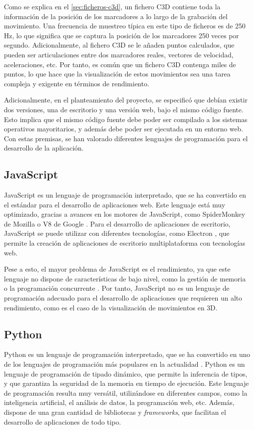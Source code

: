 Como se explica en el \autoref{sec:ficheros-c3d}, un fichero \ac{C3D} contiene toda la información de la posición de los marcadores a lo largo de la grabación del movimiento. Una frecuencia de muestreo típica en este tipo de ficheros es de 250 \ac{Hz}, lo que significa que se captura la posición de los marcadores 250 veces por segundo. Adicionalmente, al fichero \ac{C3D} se le añaden puntos calculados, que pueden ser articulaciones entre dos marcadores reales, vectores de velocidad, aceleraciones, etc. Por tanto, es común que un fichero \ac{C3D} contenga miles de puntos, lo que hace que la visualización de estos movimientos sea una tarea compleja y exigente en términos de rendimiento.

Adicionalmente, en el planteamiento del proyecto, se especificó que debían existir dos versiones, una de escritorio y una versión web, bajo el mismo código fuente. Esto implica que el mismo código fuente debe poder ser compilado a los sistemas operativos mayoritarios, y además debe poder ser ejecutada en un entorno web. Con estas premisas, se han valorado diferentes lenguajes de programación para el desarrollo de la aplicación.  

\subsection{JavaScript}
JavaScript es un lenguaje de programación interpretado, que se ha convertido en el estándar para el desarrollo de aplicaciones web. Este lenguaje está muy optimizado, gracias a avances en los motores de JavaScript, como SpiderMonkey de Mozilla o V8 de Google \autocite{srinetChromeV8Firefox2022}. Para el desarrollo de aplicaciones de escritorio, JavaScript se puede utilizar con diferentes tecnologías, como Electron \autocite{BuildCrossplatformDesktop}, que permite la creación de aplicaciones de escritorio multiplataforma con tecnologías web. 

Pese a esto, el mayor problema de JavaScript es el rendimiento, ya que este lenguaje no dispone de características de bajo nivel, como la gestión de memoria o la programación concurrente \autocite{MemoryManagementJavaScript2025,pengMultithreadingJavascript2017}. Por tanto, JavaScript no es un lenguaje de programación adecuado para el desarrollo de aplicaciones que requieren un alto rendimiento, como es el caso de la visualización de movimientos en 3D.

\subsection{Python}
Python es un lenguaje de programación interpretado, que se ha convertido en uno de los lenguajes de programación más populares en la actualidad \autocite{TIOBEIndex}. Python es un lenguaje de programación de tipado dinámico, que permite la inferencia de tipos, y que garantiza la seguridad de la memoria en tiempo de ejecución. Este lenguaje de programación resulta muy versátil, utilizándose en diferentes campos, como la inteligencia artificial, el análisis de datos, la programación web, etc. Además, dispone de una gran cantidad de bibliotecas y \textit{frameworks}, que facilitan el desarrollo de aplicaciones de todo tipo.

